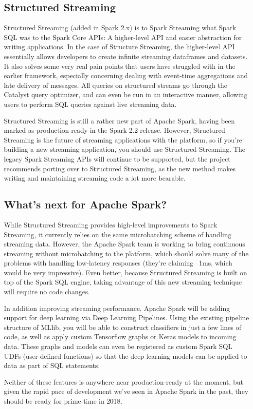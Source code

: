 \documentclass[a4paper,12pt]{article}
\begin{document}
\subsection*{Structured Streaming}

Structured Streaming (added in Spark 2.x) is to Spark Streaming what Spark SQL was to the Spark Core APIs: A higher-level API and easier abstraction for writing applications. In the case of Structure Streaming, the higher-level API essentially allows developers to create infinite streaming dataframes and datasets. It also solves some very real pain points that users have struggled with in the earlier framework, especially concerning dealing with event-time aggregations and late delivery of messages. All queries on structured streams go through the Catalyst query optimizer, and can even be run in an interactive manner, allowing users to perform SQL queries against live streaming data.

Structured Streaming is still a rather new part of Apache Spark, having been marked as production-ready in the Spark 2.2 release. However, Structured Streaming is the future of streaming applications with the platform, so if you’re building a new streaming application, you should use Structured Streaming. The legacy Spark Streaming APIs will continue to be supported, but the project recommends porting over to Structured Streaming, as the new method makes writing and maintaining streaming code a lot more bearable.

\subsection*{What’s next for Apache Spark?}

While Structured Streaming provides high-level improvements to Spark Streaming, it currently relies on the same microbatching scheme of handling streaming data. However, the Apache Spark team is working to bring continuous streaming without microbatching to the platform, which should solve many of the problems with handling low-latency responses (they’re claiming ~1ms, which would be very impressive). Even better, because Structured Streaming is built on top of the Spark SQL engine, taking advantage of this new streaming technique will require no code changes.

In addition improving streaming performance, Apache Spark will be adding support for deep learning via Deep Learning Pipelines. Using the existing pipeline structure of MLlib, you will be able to construct classifiers in just a few lines of code, as well as apply custom Tensorflow graphs or Keras models to incoming data. These graphs and models can even be registered as custom Spark SQL UDFs (user-defined functions) so that the deep learning models can be applied to data as part of SQL statements.

Neither of these features is anywhere near production-ready at the moment, but given the rapid pace of development we’ve seen in Apache Spark in the past, they should be ready for prime time in 2018.
\end{document}

